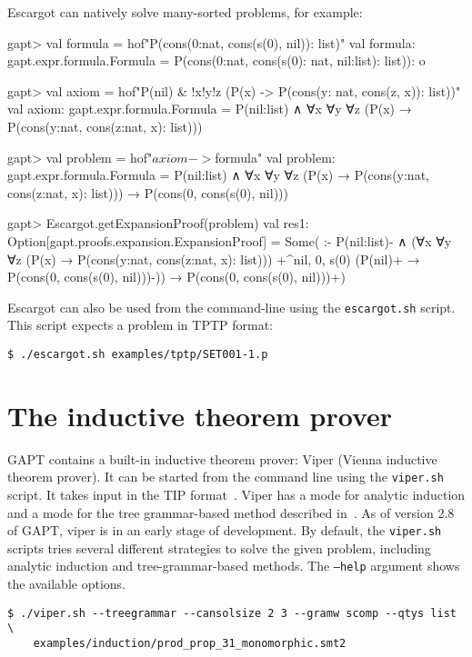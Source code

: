 \documentclass[a4paper,11pt]{book}
\newcommand{\cli}[1]{{\ttfamily {#1}}}
\begin{document}
Escargot can natively solve many-sorted problems, for example:
\begin{clilisting}
gapt> val formula = hof"P(cons(0:nat, cons(s(0), nil)): list)"
val formula: gapt.expr.formula.Formula = P(cons(0:nat, cons(s(0): nat, nil:list): list)): o

gapt> val axiom = hof"P(nil) & !x!y!z (P(x) -> P(cons(y: nat, cons(z, x)): list))"
val axiom: gapt.expr.formula.Formula = P(nil:list) ∧ ∀x ∀y ∀z (P(x) → P(cons(y:nat, cons(z:nat, x): list)))

gapt> val problem = hof"$axiom -> $formula"
val problem: gapt.expr.formula.Formula = P(nil:list) ∧ ∀x ∀y ∀z (P(x) → P(cons(y:nat, cons(z:nat, x): list))) →
  P(cons(0, cons(s(0), nil)))

gapt> Escargot.getExpansionProof(problem)
val res1: Option[gapt.proofs.expansion.ExpansionProof] = Some(
:-
P(nil:list)- ∧
    (∀x ∀y ∀z (P(x) → P(cons(y:nat, cons(z:nat, x): list)))
      +^{nil, 0, s(0)} (P(nil)+ → P(cons(0, cons(s(0), nil)))-)) →
  P(cons(0, cons(s(0), nil)))+)

\end{clilisting}


Escargot can also be used from the command-line using the \texttt{escargot.sh}
script.  This script expects a problem in TPTP format:
\begin{lstlisting}
$ ./escargot.sh examples/tptp/SET001-1.p
\end{lstlisting}

\section{The inductive theorem prover \cli{viper}}

GAPT contains a built-in inductive theorem prover: Viper (Vienna inductive theorem prover). It
can be started from the command line using the \texttt{viper.sh} script. It takes input in the
TIP format~\cite{Claessen15TIP}. Viper has a mode for analytic induction and a mode for
the tree grammar-based method described in~\cite{Eberhard15Inductive}. As of version 2.8 of GAPT,
viper is in an early stage of development.  By default, the \texttt{viper.sh}
scripts tries several different strategies to solve the given problem,
including analytic induction and tree-grammar-based methods.  The
\texttt{--help} argument shows the available options.
\begin{lstlisting}
$ ./viper.sh --treegrammar --cansolsize 2 3 --gramw scomp --qtys list \
    examples/induction/prod_prop_31_monomorphic.smt2
\end{lstlisting}
\end{document}
